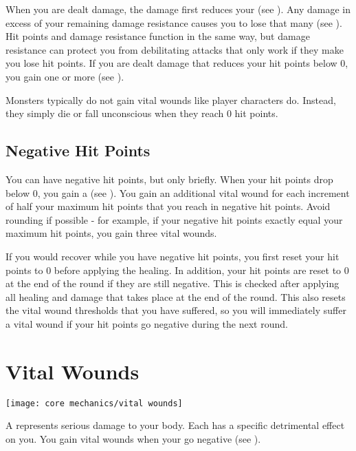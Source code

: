     When you are dealt damage, the damage first reduces your  (see ).
    Any damage in excess of your remaining damage resistance causes you to lose that many  (see ).
    Hit points and damage resistance function in the same way, but damage resistance can protect you from debilitating attacks that only work if they make you lose hit points.
    If you are dealt damage that reduces your hit points below 0, you gain one or more  (see ).

    Monsters typically do not gain vital wounds like player characters do.
    Instead, they simply die or fall unconscious when they reach 0 hit points.

    \subsection{Negative Hit Points}\label{Negative Hit Points}
        You can have negative hit points, but only briefly.
        When your hit points drop below 0, you gain a  (see ).
        You gain an additional vital wound for each increment of half your maximum hit points that you reach in negative hit points.
        Avoid rounding if possible - for example, if your negative hit points exactly equal your maximum hit points, you gain three vital wounds.

        If you would recover  while you have negative hit points, you first reset your hit points to 0 before applying the healing.
        In addition, your hit points are reset to 0 at the end of the round if they are still negative.
        This is checked after applying all healing and damage that takes place at the end of the round.
        This also resets the vital wound thresholds that you have suffered, so you will immediately suffer a vital wound if your hit points go negative during the next round.

\section{Vital Wounds}\label{Vital Wounds}
    \texttt{[image: core mechanics/vital wounds]}

    A  represents serious damage to your body.
    Each  has a specific detrimental effect on you.
    You gain vital wounds when your  go negative (see ).


